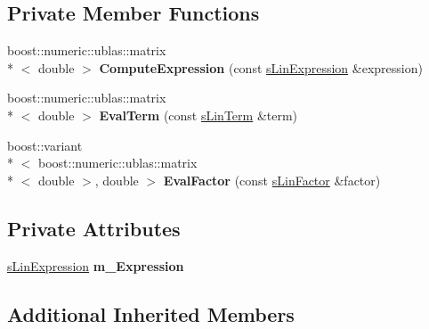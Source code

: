 \subsection*{Private Member Functions}
\begin{DoxyCompactItemize}
\item 
\hypertarget{classengine_1_1cGetMatExprCommand_aa431ea9a285f1b726ba52310cf02d44c}{boost\-::numeric\-::ublas\-::matrix\\*
$<$ double $>$ {\bfseries Compute\-Expression} (const \hyperlink{structengine_1_1sLinExpression}{s\-Lin\-Expression} \&expression)}\label{classengine_1_1cGetMatExprCommand_aa431ea9a285f1b726ba52310cf02d44c}

\item 
\hypertarget{classengine_1_1cGetMatExprCommand_a92259fad9fd3c414abe9dbb96404da40}{boost\-::numeric\-::ublas\-::matrix\\*
$<$ double $>$ {\bfseries Eval\-Term} (const \hyperlink{structengine_1_1sLinTerm}{s\-Lin\-Term} \&term)}\label{classengine_1_1cGetMatExprCommand_a92259fad9fd3c414abe9dbb96404da40}

\item 
\hypertarget{classengine_1_1cGetMatExprCommand_a8a8fe7554ec834973ff91bbeb87c2296}{boost\-::variant\\*
$<$ boost\-::numeric\-::ublas\-::matrix\\*
$<$ double $>$, double $>$ {\bfseries Eval\-Factor} (const \hyperlink{structengine_1_1sLinFactor}{s\-Lin\-Factor} \&factor)}\label{classengine_1_1cGetMatExprCommand_a8a8fe7554ec834973ff91bbeb87c2296}

\end{DoxyCompactItemize}
\subsection*{Private Attributes}
\begin{DoxyCompactItemize}
\item 
\hypertarget{classengine_1_1cGetMatExprCommand_a833ef153d1b1d6e7abb529863d46b38b}{\hyperlink{structengine_1_1sLinExpression}{s\-Lin\-Expression} {\bfseries m\-\_\-\-Expression}}\label{classengine_1_1cGetMatExprCommand_a833ef153d1b1d6e7abb529863d46b38b}

\end{DoxyCompactItemize}
\subsection*{Additional Inherited Members}


